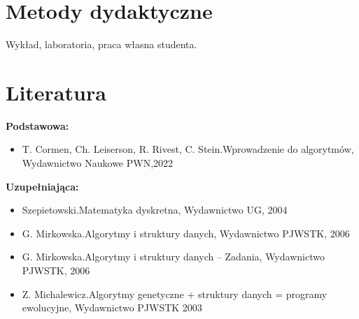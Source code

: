 \documentclass[12pt, a4paper]{article}
\begin{document}
\section{Metody dydaktyczne}

Wykład, laboratoria, praca własna studenta.

\section{Literatura}

\textbf{Podstawowa:}
\begin{itemize}
  \item T. Cormen, Ch. Leiserson, R. Rivest, C. Stein.Wprowadzenie do algorytmów, Wydawnictwo Naukowe PWN,2022
\end{itemize}

\textbf{Uzupełniająca:}
\begin{itemize}
  \item Szepietowski.Matematyka dyskretna, Wydawnictwo UG, 2004
  \item G. Mirkowska.Algorytmy i struktury danych, Wydawnictwo PJWSTK, 2006
  \item G. Mirkowska.Algorytmy i struktury danych – Zadania, Wydawnictwo PJWSTK, 2006
  \item Z. Michalewicz.Algorytmy genetyczne + struktury danych = programy ewolucyjne, Wydawnictwo PJWSTK 2003
\end{itemize}
\end{document}
